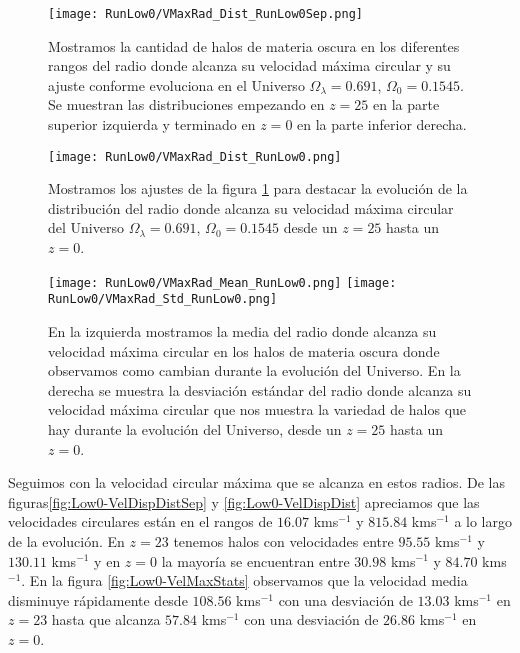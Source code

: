 \begin{figure}[H]
    \centering
    \texttt{[image: RunLow0/VMaxRad\_Dist\_RunLow0Sep.png]}
    \caption[Radio donde se alcanza la velocidad máxima circular]{\footnotesize Mostramos la cantidad de halos de materia oscura en los diferentes rangos del radio donde alcanza su velocidad máxima circular y su ajuste conforme evoluciona en el Universo $\Omega_\lambda = 0.691$, $\Omega_0 = 0.1545$. Se muestran las distribuciones empezando en $z=25$ en la parte superior izquierda y terminado en $z=0$ en la parte inferior derecha.}
    \label{fig:Low0-VMaxRadDistSep}
\end{figure}

\begin{figure}[H]
    \centering
    \texttt{[image: RunLow0/VMaxRad\_Dist\_RunLow0.png]}
    \caption[Distribución del radio donde se alcanza la velocidad máxima circular]{\footnotesize Mostramos los ajustes de la figura \ref{fig:Low0-VMaxRadDistSep} para destacar la evolución de la distribución del radio donde alcanza su velocidad máxima circular del Universo $\Omega_\lambda = 0.691$, $\Omega_0 = 0.1545$ desde un $z=25$ hasta un $z=0$.}
    \label{fig:Low0-VMaxRadDist}
\end{figure}

\begin{figure}[H]
    \centering
    \texttt{[image: RunLow0/VMaxRad\_Mean\_RunLow0.png]}
    \texttt{[image: RunLow0/VMaxRad\_Std\_RunLow0.png]}
    \caption[Media y desviación estándar del Radio donde se alcanza la velocidad máxima circular]{\footnotesize En la izquierda mostramos la media del radio donde alcanza su velocidad máxima circular en los halos de materia oscura donde observamos como cambian durante la evolución del Universo. En la derecha se muestra la desviación estándar del radio donde alcanza su velocidad máxima circular que nos muestra la variedad de halos que hay durante la evolución del Universo, desde un $z=25$ hasta un $z=0$.}
    \label{fig:Low0-VMaxRadStats}
\end{figure}

Seguimos con la velocidad circular máxima que se alcanza en estos radios. De las figuras\ref{fig:Low0-VelDispDistSep} y \ref{fig:Low0-VelDispDist} apreciamos que las velocidades circulares están en el rangos de $16.07$ kms$^{-1}$ y $815.84$ kms$^{-1}$ a lo largo de la evolución. En $z=23$ tenemos halos con velocidades entre $95.55$ kms$^{-1}$ y $130.11$ kms$^{-1}$ y en $z=0$ la mayoría se encuentran entre $30.98$ kms$^{-1}$ y $84.70$ kms$^{-1}$. En la figura \ref{fig:Low0-VelMaxStats} observamos que la velocidad media disminuye rápidamente desde $108.56$ kms$^{-1}$ con una desviación de $13.03$ kms$^{-1}$ en $z=23$ hasta que alcanza $57.84$ kms$^{-1}$ con una desviación de $26.86$ kms$^{-1}$ en $z=0$.

